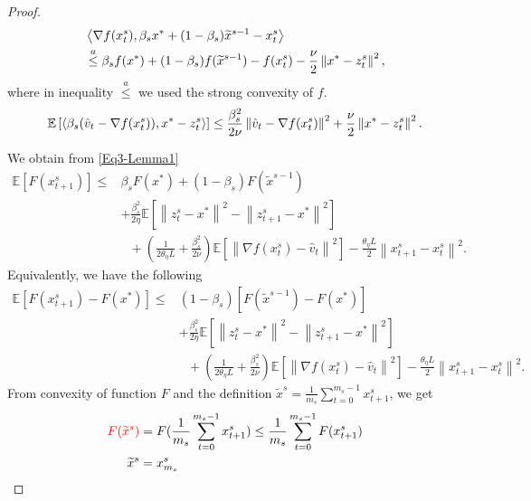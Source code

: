 \documentclass{article}
\newcommand*{\E}{\mathbb{E}}
\newcommand{\norm}[1]{\left\lVert#1\right\rVert}
\newcommand{\Iprod}[2]{\left\langle #1,#2\right\rangle}
\theoremstyle{definition}
\theoremstyle{remark}
\begin{document}
{\begin{proof}
\begin{equation}\label{Eq4-Lemma1}
\begin{split}
&\Iprod{\nabla f(x_{t}^s)}{\beta_sx^*+(1-\beta_s)\widetilde{x}^{s-1}-{x}^{s}_{t}}\\
&\stackrel{a}{\leq} \beta_sf(x^*)+(1-\beta_s)f(\widetilde{x}^{s-1})-f(x_{t}^s)-\frac{\nu}{2}\norm{x^*-z_t^s}^2,
\end{split}
\raisetag{15pt}
\end{equation}
where in inequality $\stackrel{a}{\leq}$ we used the strong convexity of $f$. 
\begin{equation}\label{Eq4-Lemma1}
\begin{split}
\E\left[\Iprod{\beta_s(\hat{v}_{t}-\nabla f(x_{t}^s))}{x^* - z_{t}^s}\right] \leq \frac{\beta_s^2}{2\nu} \norm{\hat{v}_{t}-\nabla f(x_{t}^s)}^2+\frac{\nu}{2}\norm{x^* - z_{t}^s}^2.
\end{split}
\raisetag{15pt}
\end{equation}

We obtain from \eqref{Eq3-Lemma1}
\begin{equation}
\begin{split}
\E[F(x_{t+1}^s)] \leq &\beta_s F(x^*)+(1-\beta_s)F(\widetilde{x}^{s-1})\\
&+ {\frac{\beta_s^2}{2\eta}}\E[\norm{z_{t}^s-x^*}^2-\norm{z_{t+1}^s-x^*}^2]\\
&~~~+(\frac{1}{2\theta_{\eta} L}+\frac{\beta_s^2}{2\nu})\E\left[\norm{\nabla f(x_{t}^s)-\hat{v}_{t}}^2\right]-\frac{\theta_{\eta} L}{2}\norm{x_{t+1}^s-x_{t}^s}^2. 
\end{split}
\end{equation}
Equivalently, we have the following
\begin{equation}\label{main-ine-Lemma1}
\begin{split}
\E[F(x_{t+1}^s)-F(x^*)] \leq &(1-\beta_s)[F(\widetilde{x}^{s-1})-F(x^*)] \\
&+ {\frac{ \beta_s^2}{2\eta}}\E[\norm{z_{t}^s-x^*}^2-\norm{z_{t+1}^s-x^*}^2]\\
&~~~+(\frac{1}{2\theta_{\eta} L}+\frac{\beta_s^2}{2\nu})\E\left[\norm{\nabla f(x_{t}^s)-\hat{v}_{t}}^2\right]-\frac{\theta_{\eta} L}{2}\norm{x_{t+1}^s-x_{t}^s}^2. 
\end{split}
\end{equation}
From convexity of function $F$ and the definition $\widetilde{x}^s = \frac{1}{m_s}\sum_{t=0}^{m_s-1}x_{t+1}^s$, we get 
\begin{equation}
\begin{split}
{\color{red}F(\widetilde{x}^s)} &= F(\frac{1}{m_s}\sum_{t=0}^{m_s-1} x_{t+1}^s)\leq \frac{1}{m_s}\sum_{t=0}^{m_s-1}F(x_{t+1}^s)\\
\widetilde{x}^s &= x_{m_s}^s
\end{split}
\end{equation}


\end{proof}}
\end{document}
